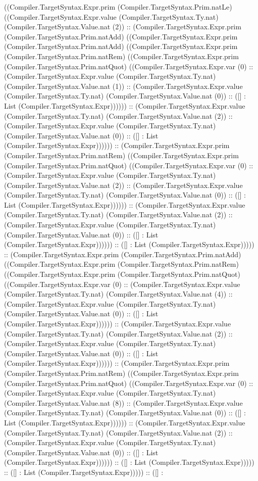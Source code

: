 \documentclass[11pt]{article}
\begin{document}
((Compiler.TargetSyntax.Expr.prim (Compiler.TargetSyntax.Prim.natLe) ((Compiler.TargetSyntax.Expr.value (Compiler.TargetSyntax.Ty.nat) (Compiler.TargetSyntax.Value.nat (2)) :: (Compiler.TargetSyntax.Expr.prim (Compiler.TargetSyntax.Prim.natAdd) ((Compiler.TargetSyntax.Expr.prim (Compiler.TargetSyntax.Prim.natAdd) ((Compiler.TargetSyntax.Expr.prim (Compiler.TargetSyntax.Prim.natRem) ((Compiler.TargetSyntax.Expr.prim (Compiler.TargetSyntax.Prim.natQuot) ((Compiler.TargetSyntax.Expr.var (0) :: (Compiler.TargetSyntax.Expr.value (Compiler.TargetSyntax.Ty.nat) (Compiler.TargetSyntax.Value.nat (1)) :: (Compiler.TargetSyntax.Expr.value (Compiler.TargetSyntax.Ty.nat) (Compiler.TargetSyntax.Value.nat (0)) :: ([] : List (Compiler.TargetSyntax.Expr)))))) :: (Compiler.TargetSyntax.Expr.value (Compiler.TargetSyntax.Ty.nat) (Compiler.TargetSyntax.Value.nat (2)) :: (Compiler.TargetSyntax.Expr.value (Compiler.TargetSyntax.Ty.nat) (Compiler.TargetSyntax.Value.nat (0)) :: ([] : List (Compiler.TargetSyntax.Expr)))))) :: (Compiler.TargetSyntax.Expr.prim (Compiler.TargetSyntax.Prim.natRem) ((Compiler.TargetSyntax.Expr.prim (Compiler.TargetSyntax.Prim.natQuot) ((Compiler.TargetSyntax.Expr.var (0) :: (Compiler.TargetSyntax.Expr.value (Compiler.TargetSyntax.Ty.nat) (Compiler.TargetSyntax.Value.nat (2)) :: (Compiler.TargetSyntax.Expr.value (Compiler.TargetSyntax.Ty.nat) (Compiler.TargetSyntax.Value.nat (0)) :: ([] : List (Compiler.TargetSyntax.Expr)))))) :: (Compiler.TargetSyntax.Expr.value (Compiler.TargetSyntax.Ty.nat) (Compiler.TargetSyntax.Value.nat (2)) :: (Compiler.TargetSyntax.Expr.value (Compiler.TargetSyntax.Ty.nat) (Compiler.TargetSyntax.Value.nat (0)) :: ([] : List (Compiler.TargetSyntax.Expr)))))) :: ([] : List (Compiler.TargetSyntax.Expr))))) :: (Compiler.TargetSyntax.Expr.prim (Compiler.TargetSyntax.Prim.natAdd) ((Compiler.TargetSyntax.Expr.prim (Compiler.TargetSyntax.Prim.natRem) ((Compiler.TargetSyntax.Expr.prim (Compiler.TargetSyntax.Prim.natQuot) ((Compiler.TargetSyntax.Expr.var (0) :: (Compiler.TargetSyntax.Expr.value (Compiler.TargetSyntax.Ty.nat) (Compiler.TargetSyntax.Value.nat (4)) :: (Compiler.TargetSyntax.Expr.value (Compiler.TargetSyntax.Ty.nat) (Compiler.TargetSyntax.Value.nat (0)) :: ([] : List (Compiler.TargetSyntax.Expr)))))) :: (Compiler.TargetSyntax.Expr.value (Compiler.TargetSyntax.Ty.nat) (Compiler.TargetSyntax.Value.nat (2)) :: (Compiler.TargetSyntax.Expr.value (Compiler.TargetSyntax.Ty.nat) (Compiler.TargetSyntax.Value.nat (0)) :: ([] : List (Compiler.TargetSyntax.Expr)))))) :: (Compiler.TargetSyntax.Expr.prim (Compiler.TargetSyntax.Prim.natRem) ((Compiler.TargetSyntax.Expr.prim (Compiler.TargetSyntax.Prim.natQuot) ((Compiler.TargetSyntax.Expr.var (0) :: (Compiler.TargetSyntax.Expr.value (Compiler.TargetSyntax.Ty.nat) (Compiler.TargetSyntax.Value.nat (8)) :: (Compiler.TargetSyntax.Expr.value (Compiler.TargetSyntax.Ty.nat) (Compiler.TargetSyntax.Value.nat (0)) :: ([] : List (Compiler.TargetSyntax.Expr)))))) :: (Compiler.TargetSyntax.Expr.value (Compiler.TargetSyntax.Ty.nat) (Compiler.TargetSyntax.Value.nat (2)) :: (Compiler.TargetSyntax.Expr.value (Compiler.TargetSyntax.Ty.nat) (Compiler.TargetSyntax.Value.nat (0)) :: ([] : List (Compiler.TargetSyntax.Expr)))))) :: ([] : List (Compiler.TargetSyntax.Expr))))) :: ([] : List (Compiler.TargetSyntax.Expr))))) :: ([] : 
\end{document}

